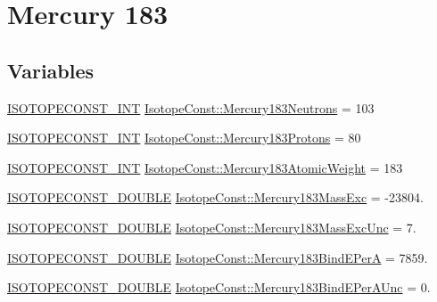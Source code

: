 \hypertarget{group___isotope_const-_mercury-_hg183}{}\section{Mercury 183}
\label{group___isotope_const-_mercury-_hg183}
\subsection*{Variables}
\begin{DoxyCompactItemize}
\item 
\mbox{\hyperlink{group___isotope_const-_macros_ga5f18360b3e99483a35c32d789e62621c}{I\+S\+O\+T\+O\+P\+E\+C\+O\+N\+S\+T\+\_\+\+I\+NT}} \mbox{\hyperlink{group___isotope_const-_mercury-_hg183_ga22b3facdb0c1091a2fe283c1cd166a2b}{Isotope\+Const\+::\+Mercury183\+Neutrons}} = 103
\item 
\mbox{\hyperlink{group___isotope_const-_macros_ga5f18360b3e99483a35c32d789e62621c}{I\+S\+O\+T\+O\+P\+E\+C\+O\+N\+S\+T\+\_\+\+I\+NT}} \mbox{\hyperlink{group___isotope_const-_mercury-_hg183_ga4236f975acc401862797ffebce4c72de}{Isotope\+Const\+::\+Mercury183\+Protons}} = 80
\item 
\mbox{\hyperlink{group___isotope_const-_macros_ga5f18360b3e99483a35c32d789e62621c}{I\+S\+O\+T\+O\+P\+E\+C\+O\+N\+S\+T\+\_\+\+I\+NT}} \mbox{\hyperlink{group___isotope_const-_mercury-_hg183_gaec4ba48774321b730a0bc3c1576fffdd}{Isotope\+Const\+::\+Mercury183\+Atomic\+Weight}} = 183
\item 
\mbox{\hyperlink{group___isotope_const-_macros_ga8f45a7272ce02c0b4c65c44636ed719a}{I\+S\+O\+T\+O\+P\+E\+C\+O\+N\+S\+T\+\_\+\+D\+O\+U\+B\+LE}} \mbox{\hyperlink{group___isotope_const-_mercury-_hg183_gac0c1d6fc3358144a3b1137be041c1385}{Isotope\+Const\+::\+Mercury183\+Mass\+Exc}} = -\/23804.
\item 
\mbox{\hyperlink{group___isotope_const-_macros_ga8f45a7272ce02c0b4c65c44636ed719a}{I\+S\+O\+T\+O\+P\+E\+C\+O\+N\+S\+T\+\_\+\+D\+O\+U\+B\+LE}} \mbox{\hyperlink{group___isotope_const-_mercury-_hg183_gade9a5a34e85021ebfcb38d9107514af0}{Isotope\+Const\+::\+Mercury183\+Mass\+Exc\+Unc}} = 7.
\item 
\mbox{\hyperlink{group___isotope_const-_macros_ga8f45a7272ce02c0b4c65c44636ed719a}{I\+S\+O\+T\+O\+P\+E\+C\+O\+N\+S\+T\+\_\+\+D\+O\+U\+B\+LE}} \mbox{\hyperlink{group___isotope_const-_mercury-_hg183_ga70b240760b049fd2d289d0ffa7014c78}{Isotope\+Const\+::\+Mercury183\+Bind\+E\+PerA}} = 7859.
\item 
\mbox{\hyperlink{group___isotope_const-_macros_ga8f45a7272ce02c0b4c65c44636ed719a}{I\+S\+O\+T\+O\+P\+E\+C\+O\+N\+S\+T\+\_\+\+D\+O\+U\+B\+LE}} \mbox{\hyperlink{group___isotope_const-_mercury-_hg183_ga228ae6884c3b62e273f4be16afa9f405}{Isotope\+Const\+::\+Mercury183\+Bind\+E\+Per\+A\+Unc}} = 0.

\end{DoxyCompactItemize}
